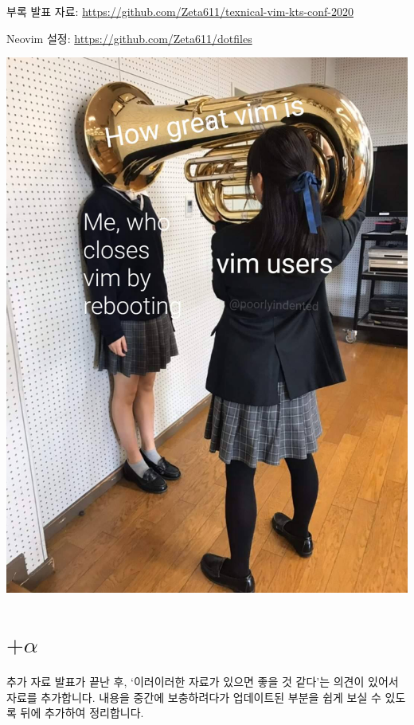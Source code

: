 \documentclass{beamer}
\begin{document}
\begin{frame}{부록}
  발표 자료: \url{https://github.com/Zeta611/texnical-vim-kts-conf-2020}

  Neovim 설정: \url{https://github.com/Zeta611/dotfiles}

  \centering\includegraphics[width=0.35\linewidth]{figures/how-great-vim-is}
\end{frame}

\section{\texorpdfstring{$+\alpha$}{+⍺}}
\begin{frame}{추가 자료}
  발표가 끝난 후, `이러이러한 자료가 있으면 좋을 것 같다'는 의견이 있어서 자료를
  추가합니다.
  내용을 중간에 보충하려다가 업데이트된 부분을 쉽게 보실 수 있도록 뒤에
  추가하여 정리합니다.
\end{frame}
\end{document}
